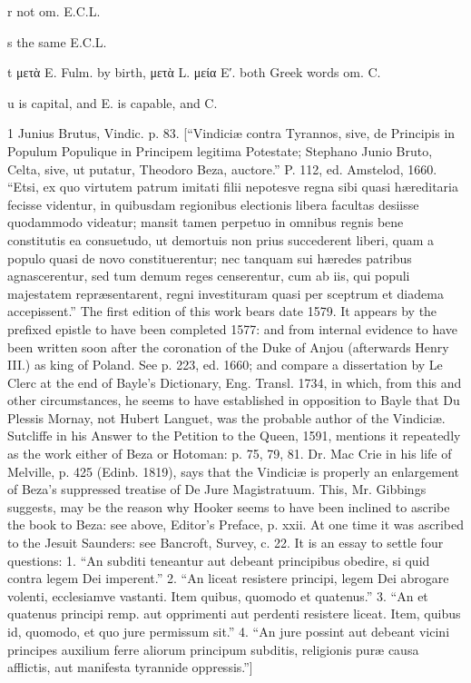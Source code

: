 r
not om. E.C.L.

s
the same E.C.L.

t
μετὰ E. Fulm. by birth, μετὰ L. μεία E′. both Greek words om. C.

u
is capital, and E. is capable, and C.

1
Junius Brutus, Vindic. p. 83. [“Vindiciæ contra Tyrannos, sive, de Principis in Populum Populique in Principem legitima Potestate; Stephano Junio Bruto, Celta, sive, ut putatur, Theodoro Beza, auctore.” P. 112, ed. Amstelod, 1660. “Etsi, ex quo virtutem patrum imitati filii nepotesve regna sibi quasi hæreditaria fecisse videntur, in quibusdam regionibus electionis libera facultas desiisse quodammodo videatur; mansit tamen perpetuo in omnibus regnis bene constitutis ea consuetudo, ut demortuis non prius succederent liberi, quam a populo quasi de novo constituerentur; nec tanquam sui hæredes patribus agnascerentur, sed tum demum reges censerentur, cum ab iis, qui populi majestatem repræsentarent, regni investituram quasi per sceptrum et diadema accepissent.” The first edition of this work bears date 1579. It appears by the prefixed epistle to have been completed 1577: and from internal evidence to have been written soon after the coronation of the Duke of Anjou (afterwards Henry III.) as king of Poland. See p. 223, ed. 1660; and compare a dissertation by Le Clerc at the end of Bayle’s Dictionary, Eng. Transl. 1734, in which, from this and other circumstances, he seems to have established in opposition to Bayle that Du Plessis Mornay, not Hubert Languet, was the probable author of the Vindiciæ. Sutcliffe in his Answer to the Petition to the Queen, 1591, mentions it repeatedly as the work either of Beza or Hotoman: p. 75, 79, 81. Dr. Mac Crie in his life of Melville, p. 425 (Edinb. 1819), says that the Vindiciæ is properly an enlargement of Beza’s suppressed treatise of De Jure Magistratuum. This, Mr. Gibbings suggests, may be the reason why Hooker seems to have been inclined to ascribe the book to Beza: see above, Editor’s Preface, p. xxii. At one time it was ascribed to the Jesuit Saunders: see Bancroft, Survey, c. 22. It is an essay to settle four questions: 1. “An subditi teneantur aut debeant principibus obedire, si quid contra legem Dei imperent.” 2. “An liceat resistere principi, legem Dei abrogare volenti, ecclesiamve vastanti. Item quibus, quomodo et quatenus.” 3. “An et quatenus principi remp. aut opprimenti aut perdenti resistere liceat. Item, quibus id, quomodo, et quo jure permissum sit.” 4. “An jure possint aut debeant vicini principes auxilium ferre aliorum principum subditis, religionis puræ causa afflictis, aut manifesta tyrannide oppressis.”]

